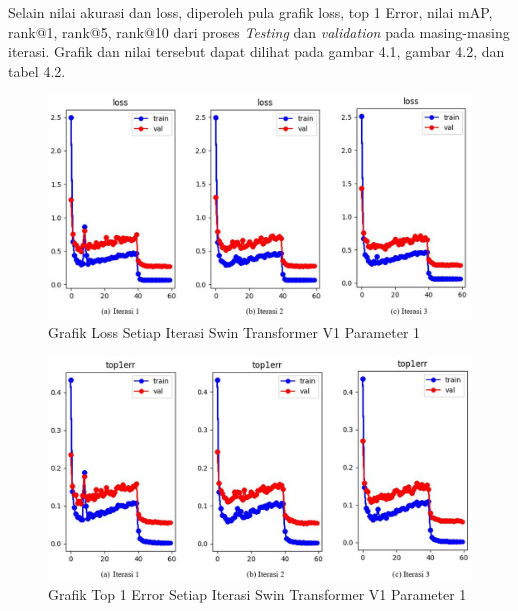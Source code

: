 Selain nilai akurasi dan loss, diperoleh pula grafik loss, top 1 Error, nilai mAP, rank@1, 
rank@5, rank@10 dari proses \emph{Testing} dan \emph{validation} pada masing-masing iterasi. 
Grafik dan nilai tersebut dapat dilihat pada gambar 4.1, gambar 4.2, dan tabel 4.2.

\begin{figure}[ht]
  \centering
  \includegraphics[scale=0.55]{gambar/Train SwinV1 Loss.png}
  \caption{Grafik Loss Setiap Iterasi Swin Transformer V1 Parameter 1}
  \label{fig:grafiklossdantop1errdariswinv1parameter1iterasi1}
\end{figure}

\begin{figure}[ht]
  \centering
  \includegraphics[scale=0.55]{gambar/Train SwinV1 Top1Err.png}
  \caption{Grafik Top 1 Error Setiap Iterasi Swin Transformer V1 Parameter 1}
  \label{fig:grafiklossdantop1errdariswinv1parameter1iterasi2}
\end{figure}


